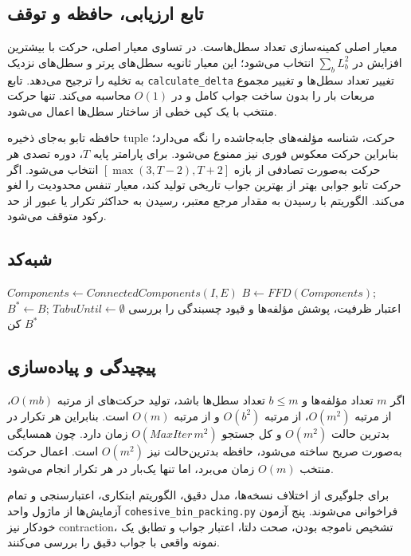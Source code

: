 \subsection{تابع ارزیابی، حافظه و توقف}
معیار اصلی کمینه‌سازی تعداد سطل‌هاست. در تساوی معیار اصلی، حرکت با بیشترین
افزایش در
$\sum_b L_b^2$
انتخاب می‌شود؛ این معیار ثانویه سطل‌های پرتر و سطل‌های نزدیک به تخلیه را ترجیح
می‌دهد. تابع \texttt{calculate\_delta} تغییر تعداد سطل‌ها و تغییر مجموع مربعات
بار را بدون ساخت جواب کامل و در $O(1)$ محاسبه می‌کند. تنها حرکت منتخب با یک
کپی خطی از ساختار سطل‌ها اعمال می‌شود.

حافظه تابو به‌جای ذخیره tuple حرکت، شناسه مؤلفه‌های جابه‌جا‌شده را نگه می‌دارد؛
بنابراین حرکت معکوس فوری نیز ممنوع می‌شود. برای پارامتر پایه $T$، دوره تصدی هر
حرکت به‌صورت تصادفی از بازه
$[\max(3,T-2),T+2]$
انتخاب می‌شود. اگر حرکت تابو جوابی بهتر از بهترین جواب تاریخی تولید کند، معیار
تنفس محدودیت را لغو می‌کند. الگوریتم با رسیدن به مقدار مرجع معتبر، رسیدن به
حداکثر تکرار یا عبور از حد رکود متوقف می‌شود.

\subsection{شبه‌کد}
\begin{algorithm}[htbp]
\caption{جستجوی تابو برای بسته‌بندی با قیود چسبندگی}\label{alg:tabu}
$Components \gets ConnectedComponents(I,E)$\;
$B \gets FFD(Components)$; $B^*\gets B$; $TabuUntil\gets\emptyset$\;
اعتبار ظرفیت، پوشش مؤلفه‌ها و قیود چسبندگی را بررسی کن\;
\Return $B^*$\;
\end{algorithm}

\subsection{پیچیدگی و پیاده‌سازی}
اگر $m$ تعداد مؤلفه‌ها و $b\le m$ تعداد سطل‌ها باشد، تولید حرکت‌های
 از مرتبه $O(mb)$،  از مرتبه $O(m^2)$،  از
مرتبه $O(b^2)$ و  از مرتبه $O(m)$ است. بنابراین هر تکرار در بدترین
حالت $O(m^2)$ و کل جستجو $O(MaxIter\,m^2)$ زمان دارد. چون همسایگی به‌صورت
صریح ساخته می‌شود، حافظه بدترین‌حالت نیز $O(m^2)$ است. اعمال حرکت منتخب
$O(m)$ زمان می‌برد، اما تنها یک‌بار در هر تکرار انجام می‌شود.

برای جلوگیری از اختلاف نسخه‌ها، مدل دقیق، الگوریتم ابتکاری، اعتبارسنجی و تمام
آزمایش‌ها از ماژول واحد \texttt{cohesive\_bin\_packing.py} فراخوانی می‌شوند.
پنج آزمون خودکار نیز contraction، تشخیص ناموجه بودن، صحت دلتا، اعتبار جواب و
تطابق یک نمونه واقعی با جواب دقیق را بررسی می‌کنند.
